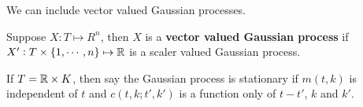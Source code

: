 We can include vector valued Gaussian processes.
\begin{definition}
    Suppose $X: T \mapsto R^n$, then $X$ is a \textbf{vector valued Gaussian process} if $X' : T \times \{1, \cdots, n\} \mapsto \mathbb{R}$ is a scaler valued Gaussian process.
\end{definition}

\begin{definition}[Stationarity]
    If $T = \mathbb{R} \times K$, then say the Gaussian process is stationary if $m(t, k)$ is independent of $t$ and $c(t, k; t', k')$ is a function only of $t-t'$, $k$ and $k'$. 
\end{definition}

